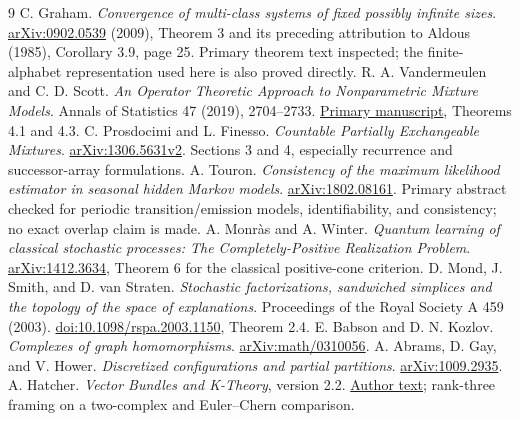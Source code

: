 \documentclass[11pt]{article}
\theoremstyle{remark}\newtheorem{remark}[theorem]{Remark}
\begin{document}
\begin{thebibliography}{9}
 C. Graham. \emph{Convergence of multi-class systems of fixed possibly infinite sizes}. \href{https://arxiv.org/pdf/0902.0539}{arXiv:0902.0539} (2009), Theorem 3 and its preceding attribution to Aldous (1985), Corollary 3.9, page 25. Primary theorem text inspected; the finite-alphabet representation used here is also proved directly.
 R. A. Vandermeulen and C. D. Scott. \emph{An Operator Theoretic Approach to Nonparametric Mixture Models}. Annals of Statistics 47 (2019), 2704--2733. \href{https://arxiv.org/pdf/1607.00071}{Primary manuscript}, Theorems 4.1 and 4.3.
 C. Prosdocimi and L. Finesso. \emph{Countable Partially Exchangeable Mixtures}. \href{https://arxiv.org/html/1306.5631v2}{arXiv:1306.5631v2}. Sections 3 and 4, especially recurrence and successor-array formulations.
 A. Touron. \emph{Consistency of the maximum likelihood estimator in seasonal hidden Markov models}. \href{https://arxiv.org/abs/1802.08161}{arXiv:1802.08161}. Primary abstract checked for periodic transition/emission models, identifiability, and consistency; no exact overlap claim is made.
 A. Monr\`as and A. Winter. \emph{Quantum learning of classical stochastic processes: The Completely-Positive Realization Problem}. \href{https://arxiv.org/abs/1412.3634}{arXiv:1412.3634}, Theorem 6 for the classical positive-cone criterion.
 D. Mond, J. Smith, and D. van Straten. \emph{Stochastic factorizations, sandwiched simplices and the topology of the space of explanations}. Proceedings of the Royal Society A 459 (2003). \href{https://doi.org/10.1098/rspa.2003.1150}{doi:10.1098/rspa.2003.1150}, Theorem 2.4.
 E. Babson and D. N. Kozlov. \emph{Complexes of graph homomorphisms}. \href{https://arxiv.org/abs/math/0310056}{arXiv:math/0310056}.
 A. Abrams, D. Gay, and V. Hower. \emph{Discretized configurations and partial partitions}. \href{https://arxiv.org/abs/1009.2935}{arXiv:1009.2935}.
 A. Hatcher. \emph{Vector Bundles and K-Theory}, version 2.2. \href{https://pi.math.cornell.edu/~hatcher/VBKT/VB.pdf}{Author text}; rank-three framing on a two-complex and Euler--Chern comparison.
\end{thebibliography}
\end{document}
